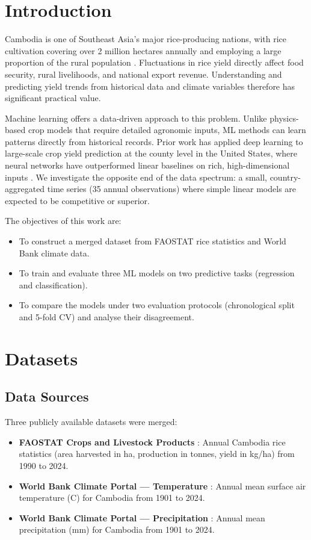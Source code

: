 \documentclass[conference]{IEEEtran}
\begin{document}
\section{Introduction}

Cambodia is one of Southeast Asia's major rice-producing nations, with rice cultivation covering over 2 million hectares annually and employing a large proportion of the rural population \cite{fao2024}. Fluctuations in rice yield directly affect food security, rural livelihoods, and national export revenue. Understanding and predicting yield trends from historical data and climate variables therefore has significant practical value.

Machine learning offers a data-driven approach to this problem. Unlike physics-based crop models that require detailed agronomic inputs, ML methods can learn patterns directly from historical records. Prior work has applied deep learning to large-scale crop yield prediction at the county level in the United States, where neural networks have outperformed linear baselines on rich, high-dimensional inputs \cite{khaki2019}. We investigate the opposite end of the data spectrum: a small, country-aggregated time series (35 annual observations) where simple linear models are expected to be competitive or superior.

The objectives of this work are:
\begin{itemize}
  \item To construct a merged dataset from FAOSTAT rice statistics and World Bank climate data.
  \item To train and evaluate three ML models on two predictive tasks (regression and classification).
  \item To compare the models under two evaluation protocols (chronological split and 5-fold CV) and analyse their disagreement.
\end{itemize}

\section{Datasets}

\subsection{Data Sources}
Three publicly available datasets were merged:
\begin{itemize}
  \item \textbf{FAOSTAT Crops and Livestock Products} \cite{fao2024}: Annual Cambodia rice statistics (area harvested in ha, production in tonnes, yield in kg/ha) from 1990 to 2024.
  \item \textbf{World Bank Climate Portal --- Temperature} \cite{wb_temp}: Annual mean surface air temperature (\textdegree C) for Cambodia from 1901 to 2024.
  \item \textbf{World Bank Climate Portal --- Precipitation} \cite{wb_rain}: Annual mean precipitation (mm) for Cambodia from 1901 to 2024.
\end{itemize}
\end{document}
